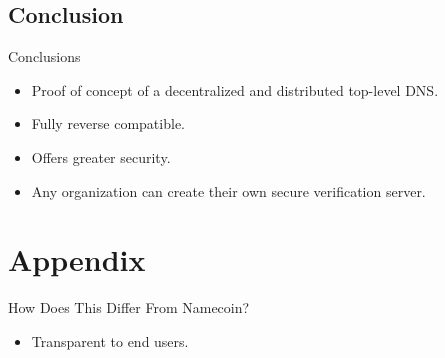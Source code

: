 \documentclass[11pt]{beamer}
\begin{document}
\subsection{Conclusion}
\begin{frame}{Conclusions}
	\begin{itemize}
		\item Proof of concept of a decentralized and distributed top-level DNS.
		\item Fully reverse compatible.
		\item Offers greater security.
		\item Any organization can create their own secure verification server.
		
	\end{itemize}
\end{frame}



\section*{Appendix}
\begin{frame}{How Does This Differ From Namecoin?}
	\begin{itemize}
		\item Transparent to end users.
	\end{itemize}
\end{frame}
\end{document}
